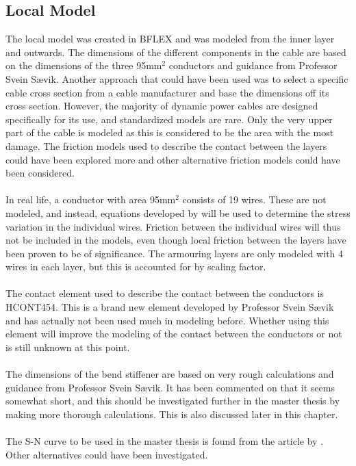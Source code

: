 \subsection{Local Model}
The local model was created in BFLEX and was modeled from the inner layer and outwards. The dimensions of the different components in the cable are based on the dimensions of the three 95mm$^2$ conductors and guidance from Professor Svein Sævik. Another approach that could have been used was to select a specific cable cross section from a cable manufacturer and base the dimensions off its cross section. However, the majority of dynamic power cables are designed specifically for its use, and standardized models are rare. Only the very upper part of the cable is modeled as this is considered to be the area with the most damage. The friction models used to describe the contact between the layers could have been explored more and other alternative friction models could have been considered. \\\\ In real life, a conductor with area 95mm$^2$ consists of 19 wires. These are not modeled, and instead, equations developed by \cite{savik2014} will be used to determine the stress variation in the individual wires. Friction between the individual wires will thus not be included in the models, even though local friction between the layers have been proven to be of significance. The armouring layers are only modeled with 4 wires in each layer, but this is accounted for by scaling factor. \\\\ The contact element used to describe the contact between the conductors is HCONT454. This is a brand new element developed by Professor Svein Sævik and has actually not been used much in modeling before. Whether using this element will improve the modeling of the contact between the conductors or not is still unknown at this point. \\\\The dimensions of the bend stiffener are based on very rough calculations and guidance from Professor Svein Sævik. It has been commented on that it seems somewhat short, and this should be investigated further in the master thesis by making more thorough calculations. This is also discussed later in this chapter. \\\\ The S-N curve to be used in the master thesis is found from the article by \cite{savik2014}. Other alternatives could have been investigated. 

